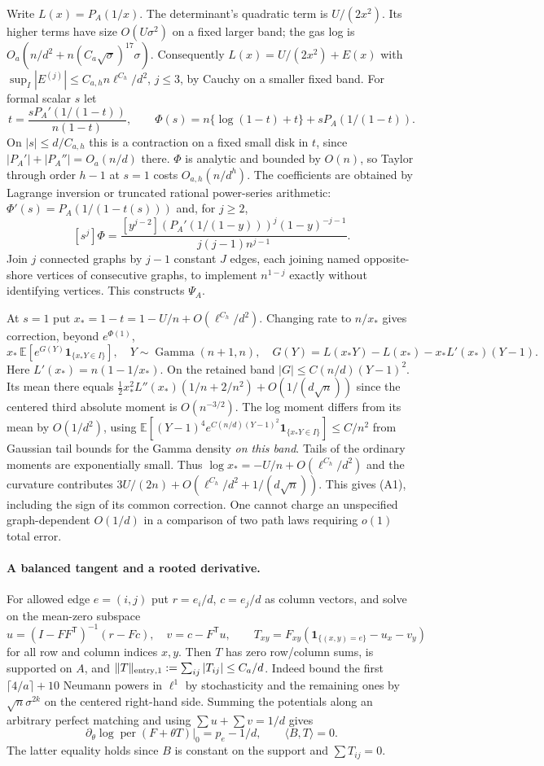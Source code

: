 Write $L(x)=P_A(1/x)$. The determinant's quadratic term is $U/(2x^2)$. Its higher terms have size $O(U\sigma^2)$ on a fixed larger band; the gas log is $O_a(n/d^2+n(C_a\sqrt{\sigma})^{17}\sigma)$. Consequently $L(x)=U/(2x^2)+E(x)$ with $\sup_I|E^{(j)}|\le C_{a,h}n\ell^{C_h}/d^2$, $j\le3$, by Cauchy on a smaller fixed band. For formal scalar $s$ let
\[
 t=\frac{sP_A'(1/(1-t))}{n(1-t)},\qquad
 \Phi(s)=n\{\log(1-t)+t\}+sP_A(1/(1-t)).
\]
On $|s|\le d/C_{a,h}$ this is a contraction on a fixed small disk in $t$, since $|P_A'|+|P_A''|=O_a(n/d)$ there. $\Phi$ is analytic and bounded by $O(n)$, so Taylor through order $h-1$ at $s=1$ costs $O_{a,h}(n/d^h)$. The coefficients are obtained by Lagrange inversion or truncated rational power-series arithmetic: $\Phi'(s)=P_A(1/(1-t(s)))$ and, for $j\ge2$,
\[
 [s^j]\Phi=\frac{[y^{j-2}](P_A'(1/(1-y)))^j(1-y)^{-j-1}}{j(j-1)n^{j-1}} .
\]
Join $j$ connected graphs by $j-1$ constant $J$ edges, each joining named opposite-shore vertices of consecutive graphs, to implement $n^{1-j}$ exactly without identifying vertices. This constructs $\Psi_A$.

At $s=1$ put $x_* =1-t=1-U/n+O(\ell^{C_h}/d^2)$. Changing rate to $n/x_*$ gives correction, beyond $e^{\Phi(1)}$,
\[
 x_*\,\mathbb E[ e^{G(Y)}\mathbf1_{\{x_*Y\in I\}}],\quad
 Y\sim\operatorname{Gamma}(n+1,n),\quad
 G(Y)=L(x_*Y)-L(x_*)-x_*L'(x_*)(Y-1).
\]
Here $L'(x_*)=n(1-1/x_*)$. On the retained band $|G|\le C(n/d)(Y-1)^2$. Its mean there equals $\tfrac12 x_*^2 L''(x_*)(1/n+2/n^2)+O(1/(d\sqrt n))$ since the centered third absolute moment is $O(n^{-3/2})$. The log moment differs from its mean by $O(1/d^2)$, using $\mathbb E[(Y-1)^4 e^{C(n/d)(Y-1)^2}\mathbf1_{\{x_*Y\in I\}}]\le C/n^2$ from Gaussian tail bounds for the Gamma density \emph{on this band}. Tails of the ordinary moments are exponentially small. Thus $\log x_*=-U/n+O(\ell^{C_h}/d^2)$ and the curvature contributes $3U/(2n)+O(\ell^{C_h}/d^2+1/(d\sqrt n))$. This gives (A1), including the sign of its common correction. One cannot charge an unspecified graph-dependent $O(1/d)$ in a comparison of two path laws requiring $o(1)$ total error.

\paragraph{A balanced tangent and a rooted derivative.}
For allowed edge $e=(i,j)$ put $r=e_i/d$, $c=e_j/d$ as column vectors, and solve on the mean-zero subspace
\[
 u=(I-FF^{\mathsf T})^{-1}(r-Fc),\quad v=c-F^{\mathsf T}u,\qquad
 T_{xy}=F_{xy}(\mathbf1_{\{(x,y)=e\}}-u_x-v_y)
\]
for all row and column indices $x,y$. Then $T$ has zero row/column sums, is supported on $A$, and $\|T\|_{\rm entry,1}:=\sum_{ij}|T_{ij}|\le C_a/d$. Indeed bound the first $\lceil4/a\rceil+10$ Neumann powers in $\ell^1$ by stochasticity and the remaining ones by $\sqrt n\sigma^{2k}$ on the centered right-hand side. Summing the potentials along an arbitrary perfect matching and using $\sum u+\sum v=1/d$ gives
\[
 \left.\partial_\theta\log\operatorname{per}(F+\theta T)\right|_0=p_e-1/d,\qquad
 \langle B,T\rangle=0 .
\]
The latter equality holds since $B$ is constant on the support and $\sum T_{ij}=0$.


